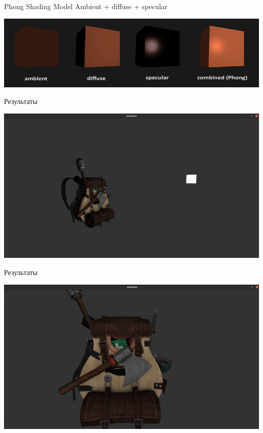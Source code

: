 \documentclass{beamer}
\begin{document}
\begin{frame}{Phong Shading Model}
    Ambient + diffuse + specular
\begin{center}
\includegraphics[width=1 \linewidth]{phong.png}
\end{center}
\end{frame}

\begin{frame}{Результаты}
    \begin{center}
    \includegraphics[width=1 \linewidth]{backpack_far.png}
    \end{center}
\end{frame}

\begin{frame}{Результаты}
    \begin{center}
    \includegraphics[width=1 \linewidth]{backpack_light.png}
    \end{center}
\end{frame}
\end{document}
